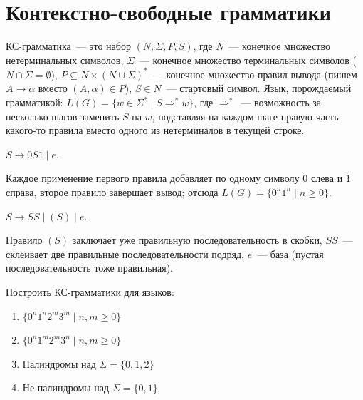 \documentclass[12pt]{article}
\begin{document}
	\section{Контекстно-свободные грамматики}

    \begin{definition}[КС-грамматика]
    	КС-грамматика~--- это набор $(N, \Sigma, P, S)$, где $N$~--- конечное множество нетерминальных символов, $\Sigma$~--- конечное множество терминальных символов ($N \cap \Sigma = \emptyset$), $P \subseteq N \times (N \cup \Sigma)^*$~--- конечное множество правил вывода (пишем $A \rightarrow \alpha$ вместо $(A, \alpha) \in P$), $S \in N$~--- стартовый символ. Язык, порождаемый грамматикой: $L(G) = \{ w \in \Sigma^* \mid S \Rightarrow^* w \}$, где $\Rightarrow^*$~--- возможность за несколько шагов заменить $S$ на $w$, подставляя на каждом шаге правую часть какого-то правила вместо одного из нетерминалов в текущей строке.
    \end{definition}
    
    \begin{example}[$0^n1^n$]
    	$S \rightarrow 0S1 \mid e$.
    	
    	Каждое применение первого правила добавляет по одному символу $0$ слева и $1$ справа, второе правило завершает вывод; отсюда $L(G) = \{ 0^n1^n \mid n \geqslant 0 \}$.
    \end{example}
    
    \begin{example}
    	$S \rightarrow SS \mid (S) \mid e$.
    	
    	Правило $(S)$ заключает уже правильную последовательность в скобки, $SS$~--- склеивает две правильные последовательности подряд, $e$~--- база (пустая последовательность тоже правильная).
    \end{example}
    
    \begin{problem}
    	Построить КС-грамматики для языков:
    	\begin{enumerate}
    		\item $\{ 0^n1^n2^m3^m \mid n, m \geqslant 0 \}$
		    \item $\{ 0^n1^m2^m3^n \mid n, m \geqslant 0 \}$
		    \item Палиндромы над $\Sigma = \{ 0, 1, 2 \}$
		    \item Не палиндромы над $\Sigma = \{ 0, 1 \}$
    	\end{enumerate}
    \end{problem}
    
\end{document}
